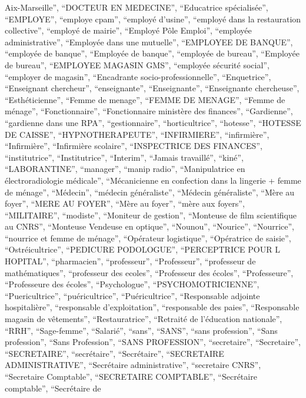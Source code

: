 \documentclass[
  letterpaper,
  DIV=11,
  numbers=noendperiod]{scrartcl}
\begin{document}
\begin{itemize}
  Aix-Marseille'', ``DOCTEUR EN MEDECINE'', ``Educatrice spécialisée'',
  ``EMPLOYE'', ``employe cpam'', ``employé d'usine'', ``employé dans la
  restauration collective'', ``employé de mairie'', ``Employé Pôle
  Emploi'', ``employée administrative'', ``Employée dans une mutuelle'',
  ``EMPLOYEE DE BANQUE'', ``employée de banque'', ``Employée de
  banque'', ``employée de bureau'', ``Employée de bureau'', ``EMPLOYEE
  MAGASIN GMS'', ``employée sécurité social'', ``employer de magasin'',
  ``Encadrante socio-professionnelle'', ``Enquetrice'', ``Enseignant
  chercheur'', ``enseignante'', ``Enseignante'', ``Enseignante
  chercheuse'', ``Esthéticienne'', ``Femme de menage'', ``FEMME DE
  MENAGE'', ``Femme de ménage'', ``Fonctionnaire'', ``Fonctionnaire
  ministère des finances'', ``Gardienne'', ``gardienne dans une RPA'',
  ``gestionnaire'', ``horticultrice'', ``hotesse'', ``HOTESSE DE
  CAISSE'', ``HYPNOTHERAPEUTE'', ``INFIRMIERE'', ``infirmière'',
  ``Infirmière'', ``Infirmière scolaire'', ``INSPECTRICE DES FINANCES'',
  ``institutrice'', ``Institutrice'', ``Interim'', ``Jamais travaillé'',
  ``kiné'', ``LABORANTINE'', ``manager'', ``manip radio'',
  ``Manipulatrice en électroradiologie médicale'', ``Mécanicienne en
  confection dans la lingerie + femme de ménage'', ``Médecin'',
  ``médecin généraliste'', ``Médecin généraliste'', ``Mère au foyer'',
  ``MERE AU FOYER'', ``Mère au foyer'', ``mère aux foyers'',
  ``MILITAIRE'', ``modiste'', ``Moniteur de gestion'', ``Monteuse de
  film scientifique au CNRS'', ``Monteuse Vendeuse en optique'',
  ``Nounou'', ``Nourice'', ``Nourrice'', ``nourrice et femme de
  ménage'', ``Opérateur logistique'', ``Opératrice de saisie'',
  ``Ostréicultrice'', ``PEDICURE PODOLOGUE'', ``PERCEPTRICE POUR L
  HOPITAL'', ``pharmacien'', ``professeur'', ``Professeur'',
  ``professeur de mathématiques'', ``professeur des ecoles'',
  ``Professeur des écoles'', ``Professeure'', ``Professeure des
  écoles'', ``Psychologue'', ``PSYCHOMOTRICIENNE'', ``Puericultrice'',
  ``puéricultrice'', ``Puéricultrice'', ``Responsable adjointe
  hospitalière'', ``responsable d'exploitation'', ``responsable des
  paies'', ``Responsable magasin de vêtements'', ``Restauratrice'',
  ``Retraité de l'éducation nationale'', ``RRH'', ``Sage-femme'',
  ``Salarié'', ``sans'', ``SANS'', ``sans profession'', ``Sans
  profession'', ``Sans Profession'', ``SANS PROFESSION'',
  ``secretaire'', ``Secretaire'', ``SECRETAIRE'', ``secrétaire'',
  ``Secrétaire'', ``SECRETAIRE ADMINISTRATIVE'', ``Secrétaire
  administrative'', ``secretaire CNRS'', ``Secretaire Comptable'',
  ``SECRETAIRE COMPTABLE'', ``Secrétaire comptable'', ``Secrétaire de

\end{itemize}
\end{document}
